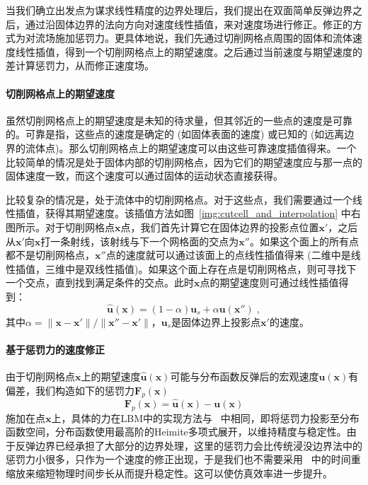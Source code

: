 当我们确立出发点为谋求线性精度的边界处理后，我们提出在双面简单反弹边界之后，通过沿固体边界的法向方向对速度线性插值，来对速度场进行修正。修正的方式为对流场施加惩罚力。更具体地说，我们先通过切削网格点周围的固体和流体速度线性插值，得到一个切削网格点上的期望速度。之后通过当前速度与期望速度的差计算惩罚力，从而修正速度场。

\paragraph{切削网格点上的期望速度}
虽然切削网格点上的期望速度是未知的待求量，但其邻近的一些点的速度是可靠的。可靠是指，这些点的速度是确定的 (如固体表面的速度) 或已知的 (如远离边界的流体点)。那么切削网格点上的期望速度可以由这些可靠速度插值得来。一个比较简单的情况是处于固体内部的切削网格点，因为它们的期望速度应与那一点的固体速度一致，而这个速度可以通过固体的运动状态直接获得。

比较复杂的情况是，处于流体中的切削网格点。对于这些点，我们需要通过一个线性插值，获得其期望速度。该插值方法如图~\ref{img:cutcell_and_interpolation} 中右图所示。对于切削网格点$\bm{x}$点，我们首先计算它在固体边界的投影点位置$\bm{x}'$，之后从$\bm{x}'$向$\bm{x}$打一条射线，该射线与下一个网格面的交点为$\bm{x}''$。如果这个面上的所有点都不是切削网格点，$\bm{x}''$点的速度就可以通过该面上的点线性插值得来 (二维中是线性插值，三维中是双线性插值)。如果这个面上存在点是切削网格点，则可寻找下一个交点，直到找到满足条件的交点。此时$\bm{x}$点的期望速度则可通过线性插值得到：
\begin{equation}  \label{eq:vel_lerp}
\hat{\bm{u}}(\bm{x})=(1-\alpha)\bm{u}_s + \alpha \bm{u}(\bm{x}'')\;,
\end{equation}
其中$\alpha=\|\bm{x}-\bm{x}'\|/\|\bm{x}''-\bm{x}'\|$，$\bm{u}_s$是固体边界上投影点$\bm{x}'$的速度。

\paragraph{基于惩罚力的速度修正}
由于切削网格点$\bm{x}$上的期望速度$\hat{\bm{u}}(\bm{x})$可能与分布函数反弹后的宏观速度$\bm{u}(\bm{x})$有偏差，我们构造如下的惩罚力$\bm{F}_p(\bm{x})$
\begin{equation} \label{eq:penaltyForce}
\bm{F}_p(\bm{x}) = \hat{\bm{u}}(\bm{x})-\bm{u}(\bm{x})
\end{equation}
施加在点$\bm{x}$上，具体的力在LBM中的实现方法与~\citep{Li-2020} 中相同，即将惩罚力投影至分布函数空间，分布函数使用最高阶的Heimite多项式展开，以维持精度与稳定性。由于反弹边界已经承担了大部分的边界处理，这里的惩罚力会比传统浸没边界法中的惩罚力小很多，只作为一个速度的修正出现，于是我们也不需要采用~\citep{Li-2020} 中的时间重缩放来缩短物理时间步长从而提升稳定性。这可以使仿真效率进一步提升。

